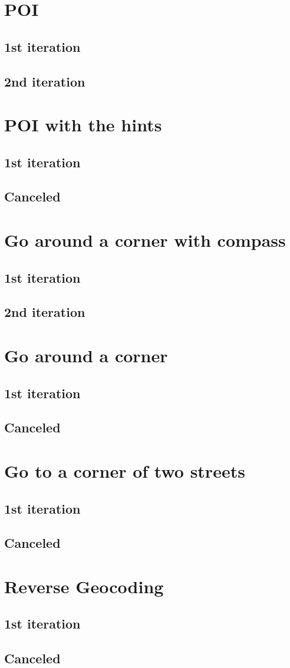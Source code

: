 		\section{POI}		
			\subsection{1st iteration}
			\subsection{2nd iteration}		
		\section{POI with the hints}
			\subsection{1st iteration}
			\subsection{Canceled}	
		\section{Go around a corner with compass}
			\subsection{1st iteration}
			\subsection{2nd iteration}
		\section{Go around a corner}
			\subsection{1st iteration}
			\subsection{Canceled}
		\section{Go to a corner of two streets}
			\subsection{1st iteration}
			\subsection{Canceled}
		\section{Reverse Geocoding}
			\subsection{1st iteration}
			\subsection{Canceled}
		
		